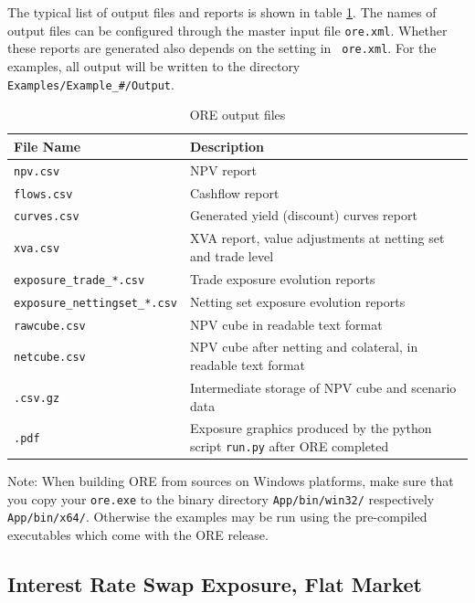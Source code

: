 \documentclass[12pt, a4paper]{article}
\begin{document}
The typical list of output files and reports is shown in table \ref{tab_2}. The names of output files can be configured
through the master input file {\tt ore.xml}. Whether these reports are generated also depends on the setting in {\tt
  ore.xml}. For the examples, all output will be written to the directory {\tt Examples/Example\_\#/Output}.

\begin{table}[h]
\scriptsize
\begin{center}
\begin{tabular}{|l|p{11cm}|}
\hline
File Name & Description \\
\hline
{\tt npv.csv}&   NPV report \\
{\tt flows.csv} & Cashflow report \\
{\tt curves.csv} & Generated yield (discount) curves report \\
{\tt xva.csv} & XVA report, value adjustments at netting set and trade level \\
{\tt exposure\_trade\_*.csv} & Trade exposure evolution reports\\
{\tt exposure\_nettingset\_*.csv} &  Netting set exposure evolution reports\\
{\tt rawcube.csv} & NPV cube in readable text format \\
{\tt netcube.csv} & NPV cube after netting and colateral, in readable text format \\
{\tt *.csv.gz} & Intermediate storage of NPV cube and scenario data \\
{\tt *.pdf} &  Exposure graphics produced by the python script {\tt run.py} after ORE completed\\
\hline
\end{tabular}
\end{center}
\caption{ORE output files}
\label{tab_2}
\end{table}

Note: When building ORE from sources on Windows platforms, make sure that you copy your {\tt ore.exe} to the binary
directory {\tt App/bin/win32/} respectively {\tt App/bin/x64/}. Otherwise the examples may be run using the pre-compiled
executables which come with the ORE release.

\subsection{Interest Rate Swap Exposure, Flat Market}\label{sec:example1}
\end{document}
